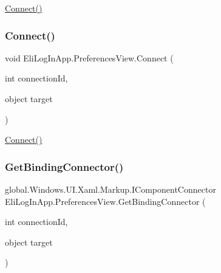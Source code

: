\hyperlink{class_eli_log_in_app_1_1_preferences_view_a979b48f7f808413a31c72a11ae2918c8}{Connect()} 

\mbox{\label{class_eli_log_in_app_1_1_preferences_view_a979b48f7f808413a31c72a11ae2918c8}} 
\subsubsection{\texorpdfstring{Connect()}{Connect()}\hspace{0.1cm}{\footnotesize\ttfamily [3/3]}}
{\footnotesize\ttfamily void Eli\+Log\+In\+App.\+Preferences\+View.\+Connect (\begin{DoxyParamCaption}\item[{int}]{connection\+Id,  }\item[{object}]{target }\end{DoxyParamCaption})\hspace{0.3cm}{\ttfamily [inline]}}



\hyperlink{class_eli_log_in_app_1_1_preferences_view_a979b48f7f808413a31c72a11ae2918c8}{Connect()} 

\mbox{\label{class_eli_log_in_app_1_1_preferences_view_a6273030198e76482848eb8950537747a}} 
\subsubsection{\texorpdfstring{Get\+Binding\+Connector()}{GetBindingConnector()}\hspace{0.1cm}{\footnotesize\ttfamily [1/3]}}
{\footnotesize\ttfamily global.\+Windows.\+U\+I.\+Xaml.\+Markup.\+I\+Component\+Connector Eli\+Log\+In\+App.\+Preferences\+View.\+Get\+Binding\+Connector (\begin{DoxyParamCaption}\item[{int}]{connection\+Id,  }\item[{object}]{target }\end{DoxyParamCaption})\hspace{0.3cm}{\ttfamily [inline]}}

